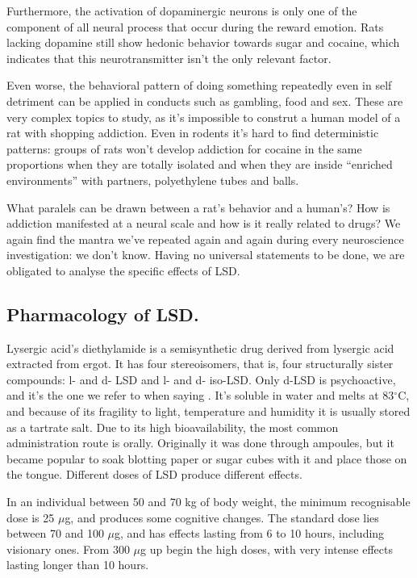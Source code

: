 Furthermore, the activation of dopaminergic neurons is only one of the component of all neural process that occur during the reward emotion. Rats lacking dopamine still show hedonic behavior towards sugar and cocaine, which indicates that this neurotransmitter isn't the only relevant factor.

Even worse, the behavioral pattern of doing something repeatedly even in self detriment can be applied in conducts such as gambling, food and sex. These are very complex topics to study, as it's impossible to construt a human model of a rat with shopping addiction. Even in rodents it's hard to find deterministic patterns: groups of rats won't develop addiction for cocaine in the same proportions when they are totally isolated and when they are inside \enquote{enriched environments} with partners, polyethylene tubes and balls.

What paralels can be drawn between a rat's behavior and a human's? How is addiction manifested at a neural scale and how is it really related to drugs? We again find the mantra we've repeated again and again during every neuroscience investigation: we don't know. Having no universal statements to be done, we are obligated to analyse the specific effects of LSD.

\newpage

\subsection{Pharmacology of LSD.}

Lysergic acid's diethylamide is a semisynthetic drug derived from lysergic acid extracted from ergot. It has four stereoisomers, that is, four structurally sister compounds: l- and d- LSD and l- and d- iso-LSD. Only d-LSD is psychoactive, and it's the one we refer to when saying . It's soluble in water and melts at 83$^\circ$C, and because of its fragility to light, temperature and humidity it is usually stored as a tartrate salt. Due to its high bioavailability, the most common administration route is orally. Originally it was done through ampoules, but it became popular to soak blotting paper or sugar cubes with it and place those on the tongue. Different doses of LSD produce different effects.

In an individual between 50 and 70 kg of body weight, the minimum recognisable dose is 25 $\mu$g, and produces some cognitive changes. The standard dose lies between 70 and 100 $\mu$g, and has effects lasting from 6 to 10 hours, including visionary ones. From 300 $\mu$g up begin the high doses, with very intense effects lasting longer than 10 hours.

